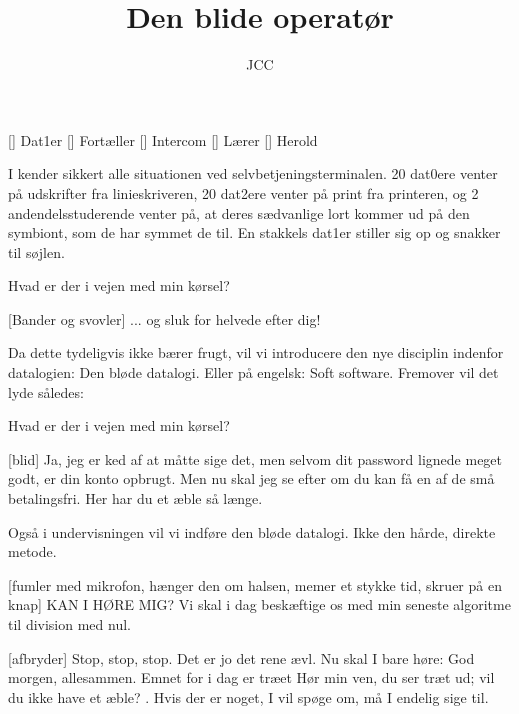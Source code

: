 \documentclass[a4paper,11pt]{article}
\title{Den blide operatør}
\author{JCC}
\begin{document}
\maketitle

\begin{roles}
[] Dat1er
[] Fortæller
[] Intercom
[] Lærer
[] Herold
\end{roles}

\begin{sketch}


 I kender sikkert alle situationen ved
selvbetjeningsterminalen.  20 dat0ere venter på udskrifter fra
linieskriveren, 20 dat2ere venter på print fra printeren, og 2
andendelsstuderende venter på, at deres sædvanlige lort kommer ud på
den symbiont, som de har symmet de til.  En stakkels dat1er stiller
sig op og snakker til søjlen.

 Hvad er der i vejen med min kørsel?

[Bander og svovler] ... og sluk for helvede efter dig!


 Da dette tydeligvis ikke bærer frugt, vil vi introducere den
nye disciplin indenfor datalogien: Den bløde datalogi.  Eller på
engelsk: Soft software.  Fremover vil det lyde således:

 Hvad er der i vejen med min kørsel?

[blid] Ja, jeg er ked af at måtte sige det, men selvom dit
password lignede meget godt, er din konto opbrugt.  Men nu skal jeg se
efter om du kan få en af de små betalingsfri.  Her har du et æble så
længe.


 Også i undervisningen vil vi indføre den bløde datalogi.
Ikke den hårde, direkte metode.

[fumler med mikrofon, hænger den om halsen, memer et stykke
tid, skruer på en knap] KAN I HØRE MIG?   Vi skal i dag beskæftige os med min
seneste algoritme til division med nul.

[afbryder] Stop, stop, stop.  Det er jo det rene ævl.  Nu skal
I bare høre: God morgen, allesammen.  Emnet for i dag er træet
 Hør min ven, du
ser træt ud; vil du ikke have et æble?  .  Hvis der er noget, I vil spøge om, må I
endelig sige til.


\end{sketch}
\end{document}
